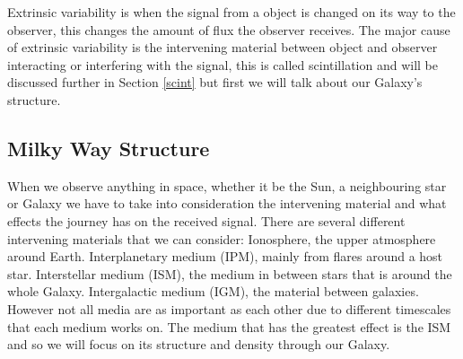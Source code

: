 \documentclass[a4paper, 10pt]{article}
\begin{document}
Extrinsic variability is when the signal from a object is changed on its way to the observer, this changes the amount of flux the observer receives. The major cause of extrinsic variability is the intervening material between object and observer interacting or interfering with the signal, this is called scintillation and will be discussed further in Section \ref{scint} but first we will talk about our Galaxy's structure.\\

\subsection{Milky Way Structure}
When we observe anything in space, whether it be the Sun, a neighbouring star or Galaxy we have to take into consideration the intervening material and what effects the journey has on the received signal. There are several different intervening materials that we can consider: Ionosphere, the upper atmosphere around Earth. Interplanetary medium (IPM), mainly from flares around a host star. Interstellar medium (ISM), the medium in between stars that is around the whole Galaxy. Intergalactic medium (IGM), the material between galaxies. However not all media are as important as each other due to different timescales that each medium works on. The medium that has the greatest effect is the ISM and so we will focus on its structure and density through our Galaxy.\\
\end{document}
